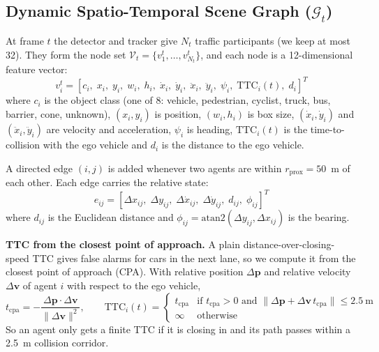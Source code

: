 \documentclass[preprint,12pt]{elsarticle}
\begin{document}
\subsection{Dynamic Spatio-Temporal Scene Graph ($\mathcal{G}_t$)}
At frame $t$ the detector and tracker give $N_t$ traffic participants (we keep at most 32). They form the node set $\mathcal{V}_t = \{v_1^t, \dots, v_{N_t}^t\}$, and each node is a 12-dimensional feature vector:
\begin{equation}
    v_i^t = \left[c_i, \; x_i, \; y_i, \; w_i, \; h_i, \; \dot{x}_i, \; \dot{y}_i, \; \ddot{x}_i, \; \ddot{y}_i, \; \psi_i, \; \text{TTC}_i(t), \; d_i\right]^T
    \label{eq_node}
\end{equation}
where $c_i$ is the object class (one of 8: vehicle, pedestrian, cyclist, truck, bus, barrier, cone, unknown), $(x_i, y_i)$ is position, $(w_i, h_i)$ is box size, $(\dot{x}_i, \dot{y}_i)$ and $(\ddot{x}_i, \ddot{y}_i)$ are velocity and acceleration, $\psi_i$ is heading, $\text{TTC}_i(t)$ is the time-to-collision with the ego vehicle and $d_i$ is the distance to the ego vehicle.

A directed edge $(i,j)$ is added whenever two agents are within $r_{\text{prox}} = 50$~m of each other. Each edge carries the relative state:
\begin{equation}
    e_{ij} = \left[\Delta x_{ij}, \; \Delta y_{ij}, \; \Delta \dot{x}_{ij}, \; \Delta \dot{y}_{ij}, \; d_{ij}, \; \phi_{ij}\right]^T
    \label{eq_edge}
\end{equation}
where $d_{ij}$ is the Euclidean distance and $\phi_{ij} = \text{atan2}(\Delta y_{ij}, \Delta x_{ij})$ is the bearing.

\textbf{TTC from the closest point of approach.} A plain distance-over-closing-speed TTC gives false alarms for cars in the next lane, so we compute it from the closest point of approach (CPA). With relative position $\Delta\mathbf{p}$ and relative velocity $\Delta\mathbf{v}$ of agent $i$ with respect to the ego vehicle,
\begin{equation}
    t_{\text{cpa}} = -\frac{\Delta\mathbf{p} \cdot \Delta\mathbf{v}}{\|\Delta\mathbf{v}\|^2}, \qquad
    \text{TTC}_i(t) = \begin{cases}
    t_{\text{cpa}} & \text{if } t_{\text{cpa}} > 0 \text{ and } \|\Delta\mathbf{p} + \Delta\mathbf{v}\, t_{\text{cpa}}\| \le 2.5~\text{m} \\
    \infty & \text{otherwise}
    \end{cases}
    \label{eq_ttc}
\end{equation}
So an agent only gets a finite TTC if it is closing in and its path passes within a 2.5~m collision corridor.
\end{document}
